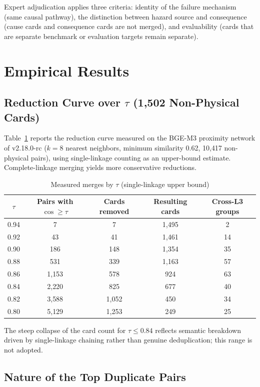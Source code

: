 \documentclass[11pt,a4paper]{article}
\begin{document}
Expert adjudication applies three criteria: identity of the failure mechanism (same causal pathway), the distinction between hazard source and consequence (cause cards and consequence cards are not merged), and evaluability (cards that are separate benchmark or evaluation targets remain separate).

\section{Empirical Results}

\subsection{Reduction Curve over $\tau$ (1{,}502 Non-Physical Cards)}

Table~\ref{tab:sweep} reports the reduction curve measured on the BGE-M3 proximity network of v2.18.0-rc ($k=8$ nearest neighbors, minimum similarity 0.62, 10{,}417 non-physical pairs), using single-linkage counting as an upper-bound estimate. Complete-linkage merging yields more conservative reductions.

\begin{table}[htbp]
\centering
\caption{Measured merges by $\tau$ (single-linkage upper bound)}
\label{tab:sweep}
\begin{tabular}{ccccc}
\toprule
$\tau$ & Pairs with $\cos\geq\tau$ & Cards removed & Resulting cards & Cross-L3 groups \\
\midrule
0.94 & 7 & 7 & 1{,}495 & 2 \\
0.92 & 43 & 41 & 1{,}461 & 14 \\
0.90 & 186 & 148 & 1{,}354 & 35 \\
0.88 & 531 & 339 & 1{,}163 & 57 \\
0.86 & 1{,}153 & 578 & 924 & 63 \\
0.84 & 2{,}220 & 825 & 677 & 40 \\
0.82 & 3{,}588 & 1{,}052 & 450 & 34 \\
0.80 & 5{,}129 & 1{,}253 & 249 & 25 \\
\bottomrule
\end{tabular}
\end{table}

The steep collapse of the card count for $\tau \leq 0.84$ reflects semantic breakdown driven by single-linkage chaining rather than genuine deduplication; this range is not adopted.

\subsection{Nature of the Top Duplicate Pairs}
\end{document}
